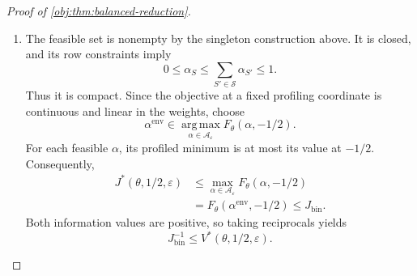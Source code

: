 \begin{proof}[Proof of \cref{obj:thm:balanced-reduction}]
\begin{enumerate}
We now identify this information with the staircase objective. Balance
gives
\[
\tau=1-2\mu_0,
\qquad
\pi_\theta
=\frac12(1-\mu_0,\mu_0,\mu_0,1-\mu_0)^\top.
\]
Hence, for every \(S\in\mathcal S\),
\[
\begin{aligned}
h_S(\theta)
&=\frac{(1-\mu_0)\{b_S(0)+b_S(3)\}
+\mu_0\{b_S(1)+b_S(2)\}}2,\\
g_S^\top v(-1/2)
&=\frac{b_S(0)+b_S(3)-b_S(1)-b_S(2)}4.
\end{aligned}
\]
Define the grouped atomic probabilities by
\[
q_{\alpha,+}(S)
:=\frac{\alpha_S\{b_S(0)+b_S(3)\}}2,
\qquad
q_{\alpha,-}(S)
:=\frac{\alpha_S\{b_S(1)+b_S(2)\}}2.
\]
The discrete Fisher-information formula therefore gives
\[
\begin{aligned}
\mathcal I_\alpha
&=
\sum_{S\in\mathcal S}
\frac{\bigl\{(q_{\alpha,+}(S)-q_{\alpha,-}(S))/2\bigr\}^2}
{\{(1+\tau)q_{\alpha,+}(S)
+(1-\tau)q_{\alpha,-}(S)\}/2}\\
&=
\sum_{S\in\mathcal S}
\alpha_S\frac{(g_S^\top v(-1/2))^2}{h_S(\theta)}
=F_\theta(\alpha,-1/2).
\end{aligned}
\]
Here a summand with \(\alpha_S=0\) is defined as zero; both grouped
probabilities then vanish. When \(\alpha_S>0\), its mixture probability
is \(\alpha_Sh_S(\theta)>0\), and the displayed equality follows by
cancellation. We have proved
\[
F_\theta(\alpha,-1/2)\le J_{\mathrm{bin}}
\qquad\text{for every }\alpha\in\mathcal A_\varepsilon.
\]

\item The feasible set is nonempty by the singleton construction above.
It is closed, and its row constraints imply
\[
0\le\alpha_S\le\sum_{S'\in\mathcal S}\alpha_{S'}\le1.
\]
Thus it is compact. Since the objective at a fixed profiling coordinate
is continuous and linear in the weights, choose
\[
\alpha^{\mathrm{env}}
\in\operatorname*{arg\,max}_{\alpha\in\mathcal A_\varepsilon}
F_\theta(\alpha,-1/2).
\]
For each feasible \(\alpha\), its profiled minimum is at most its value
at \(-1/2\). Consequently,
\[
\begin{aligned}
J^*(\theta,1/2,\varepsilon)
&\le
\max_{\alpha\in\mathcal A_\varepsilon}
F_\theta(\alpha,-1/2)\\
&=F_\theta(\alpha^{\mathrm{env}},-1/2)
\le J_{\mathrm{bin}}.
\end{aligned}
\]
Both information values are positive, so taking reciprocals yields
\[
J_{\mathrm{bin}}^{-1}
\le V^*(\theta,1/2,\varepsilon).
\]


\end{enumerate}
\end{proof}
